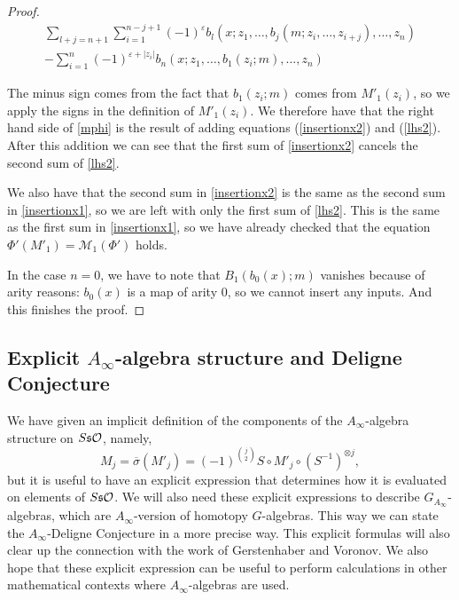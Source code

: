 \documentclass[Thesis.tex]{subfiles}
\begin{document}
\begin{proof}
 \begin{align}\label{lhs2}
 \sum_{l+j=n+1}\sum_{i=1}^{n-j+1}(-1)^{\varepsilon} b_l(x;z_1,\dots,b_j(m;z_{i},\dots, z_{i+j}),\dots, z_n)\\\nonumber -\sum_{i=1}^{n} (-1)^{\varepsilon+|z_i|}b_n(x;z_1,\dots,b_1(z_{i};m),\dots, z_n)
 \end{align}
 
 The minus sign comes from the fact that $b_1(z_i;m)$ comes from $M'_1(z_i)$, so we apply the signs in the definition of $M'_1(z_i)$. We therefore have that the right hand side of \cref{mphi} is the result of adding equations (\ref{insertionx2}) and (\ref{lhs2}). After this addition we can see that the first sum of \cref{insertionx2} cancels the second sum of \cref{lhs2}. 

 We also have that the second sum in \cref{insertionx2} is the same as the second sum in \cref{insertionx1}, so we are left with only the first sum of \cref{lhs2}. This is the same as the first sum in \cref{insertionx1}, so we have already checked that the equation $\Phi'(M'_1)=\mathcal{M}_1(\Phi')$ holds. 
  
 In the case $n=0$, we have to note that $B_1(b_0(x);m)$ vanishes because of arity reasons: $b_0(x)$ is a map of arity 0, so we cannot insert any inputs. And this finishes the proof.
 \end{proof}
 
 \subsection{Explicit $A_\infty$-algebra structure and Deligne Conjecture}\label{sect4}

We have given an implicit definition of the components of the $A_\infty$-algebra structure on $S\mathfrak{s}{\mathcal O}$, namely, \[M_j=\overline{\sigma}(M'_j)=(-1)^{\binom{j}{2}}S\circ M'_j\circ(S^{-1})^{\otimes j},\]
but it is useful to have an explicit expression that determines how it is evaluated on elements of $S\mathfrak{s}{\mathcal O}$. We will also need these explicit expressions to describe $G_{A_\infty}$-algebras, which are $A_\infty$-version of homotopy $G$-algebras. This way we can state the $A_\infty$-Deligne Conjecture in a more precise way. This explicit formulas will also clear up the connection with the work of Gerstenhaber and Voronov. We also hope that these explicit expression can be useful to perform calculations in other mathematical contexts where $A_\infty$-algebras are used.
\end{document}
